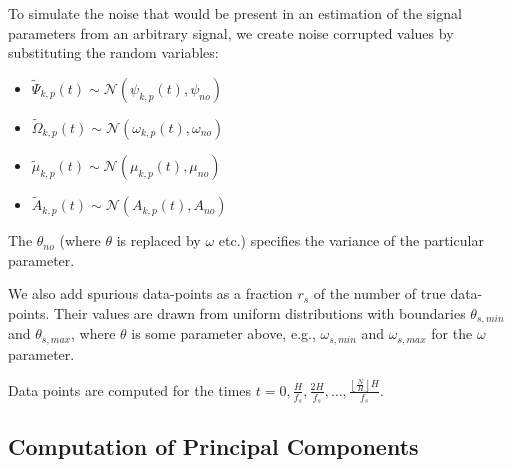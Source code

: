 \documentclass[letterpaper,12pt]{report}
\begin{document}
To simulate the noise that would be present in an estimation of the signal
parameters from an arbitrary signal, we create noise corrupted values by
substituting the random variables:
\begin{itemize}
    \item
        $\tilde{\Psi}_{k,p}(t) \sim
        \mathcal{N}(\psi_{k,p}(t),\psi_{no})$
    \item
        $\tilde{\Omega}_{k,p}(t) \sim
        \mathcal{N}(\omega_{k,p}(t),\omega_{no})$
    \item
        $\tilde{\mu}_{k,p}(t) \sim
        \mathcal{N}(\mu_{k,p}(t),\mu_{no})$
    \item
        $\tilde{A}_{k,p}(t) \sim
        \mathcal{N}(A_{k,p}(t),A_{no})$
\end{itemize}
The $\theta_{no}$ (where $\theta$ is replaced by $\omega$ etc.) specifies the
variance of the particular parameter.

We also add spurious data-points as a fraction $r_{s}$ of the number of true
data-points. Their values are drawn from uniform distributions with boundaries
$\theta_{s,min}$ and $\theta_{s,max}$, where $\theta$ is some parameter above,
e.g., $\omega_{s,min}$ and $\omega_{s,max}$ for the $\omega$ parameter.

Data points are computed for the times $t = 0,\frac{H}{f_{s}},\frac{2
H}{f_{s}},\ldots,\frac{\left\lfloor \frac{N}{H} \right\rfloor H}{f_{s}}$.

\subsection{Computation of Principal Components}
\end{document}

